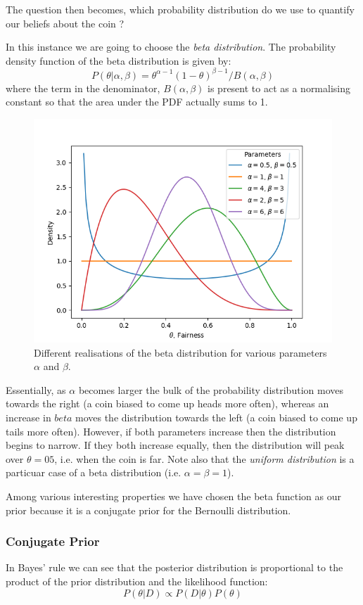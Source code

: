 The question then becomes, which probability distribution do we use to quantify our beliefs about the coin ?

In this instance we are going to choose the \emph{beta distribution}. The probability density function of the beta distribution is given by:
\begin{equation}
	P(\theta|\alpha,\beta)=\theta^{\alpha -1}(1-\theta)^{\beta-1}/B(\alpha,\beta)
\end{equation}
where the term in the denominator, $B(\alpha,\beta)$ is present to act as a normalising constant so that the area under the PDF actually sums to 1.

\begin{figure}[htb]
  \centering
  \includegraphics[width=.7\textwidth]{figures/beta_distro}
  \caption{Different realisations of the beta distribution for various parameters $\alpha$ and $\beta$.}
  \label{fig:beta_distro}
\end{figure}

Essentially, as $\alpha$ becomes larger the bulk of the probability distribution moves towards the right (a coin biased to come up heads more often), whereas an increase in $beta$ moves the distribution towards the left (a coin biased to come up tails more often).
However, if both parameters increase then the distribution begins to narrow. If they both increase equally, then the distribution will peak over $\theta=05$, i.e. when the coin is far. Note also that the \emph{uniform distribution} is a particuar case of a beta distribution (i.e. $\alpha = \beta = 1$).

Among various interesting properties we have chosen the beta function as our prior because it is a conjugate prior for the Bernoulli distribution.

\subsubsection{Conjugate Prior}
In Bayes' rule we can see that the posterior distribution is proportional to the product of the prior distribution and the likelihood function:
\begin{equation}
  P(\theta|D)\propto P(D|\theta)P(\theta)
\end{equation}

